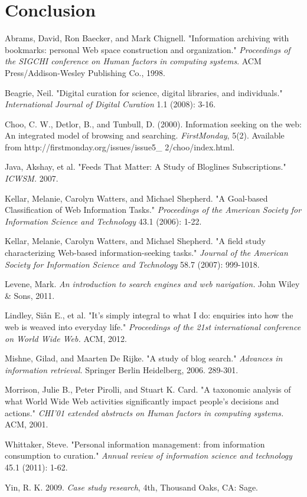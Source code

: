 \documentclass{casconpaper}
\begin{document}
{\section{Conclusion}
 
} %



{\begin{thebibliography}{9}
 Abrams, David, Ron Baecker, and Mark Chignell. "Information archiving with bookmarks: personal Web space construction and organization." \emph{Proceedings of the SIGCHI conference on Human factors in computing systems}. ACM Press/Addison-Wesley Publishing Co., 1998.


Beagrie, Neil. "Digital curation for science, digital libraries, and individuals." \emph{International Journal of Digital Curation} 1.1 (2008): 3-16.




Choo, C. W., Detlor, B., and Tunbull, D. (2000). Information seeking on the web: An integrated model of browsing and searching.  \emph{FirstMonday}, 5(2). Available from http://firstmonday.org/issues/issue5\_
2/choo/index.html.

	Java, Akshay, et al. "Feeds That Matter: A Study of Bloglines Subscriptions." \emph{ ICWSM.} 2007.
   
 Kellar, Melanie, Carolyn Watters, and Michael Shepherd. "A Goal-based Classification of Web Information Tasks." \emph{Proceedings of the American Society for Information Science and Technology} 43.1 (2006): 1-22.

Kellar, Melanie, Carolyn Watters, and Michael Shepherd. "A field study characterizing Web-based information-seeking tasks." \emph{Journal of the American Society for Information Science and Technology} 58.7 (2007): 999-1018.

Levene, Mark.  \emph{An introduction to search engines and web navigation.} John Wiley \& Sons, 2011.

Lindley, Siân E., et al. "It's simply integral to what I do: enquiries into how the web is weaved into everyday life." \emph{Proceedings of the 21st international conference on World Wide Web.} ACM, 2012.

Mishne, Gilad, and Maarten De Rijke. "A study of blog search." \emph{Advances in information retrieval.} Springer Berlin Heidelberg, 2006. 289-301.

Morrison, Julie B., Peter Pirolli, and Stuart K. Card. "A taxonomic analysis of what World Wide Web activities significantly impact people's decisions and actions." \emph{CHI'01 extended abstracts on Human factors in computing systems.} ACM, 2001.

Whittaker, Steve. "Personal information management: from information consumption to curation." \emph{Annual review of information science and technology} 45.1 (2011): 1-62.

 Yin, R. K. 2009. \emph{Case study research}, 4th, Thousand Oaks, CA: Sage.
    
\end{thebibliography}
} %
\end{document}
